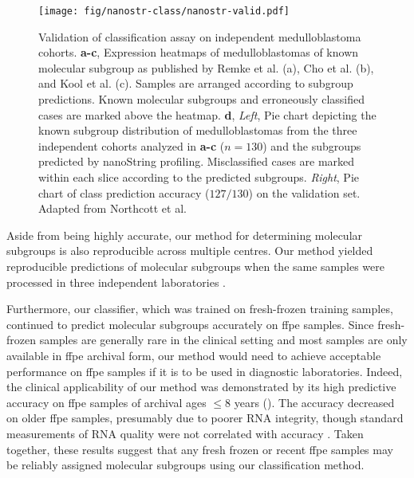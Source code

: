 \begin{figure}[hb]
	\begin{center}
		\texttt{[image: fig/nanostr-class/nanostr-valid.pdf]}
	\end{center}
	\caption[Validation of classification assay on independent medulloblastoma cohorts]
	{
	Validation of classification assay on independent medulloblastoma cohorts.
	\textbf{a-c}, Expression heatmaps of medulloblastomas of known molecular subgroup as published by Remke et al. (a), Cho et al. (b), and Kool et al. (c). Samples are arranged according to subgroup predictions. Known molecular subgroups and erroneously classified cases are marked above the heatmap.
	\textbf{d}, \emph{Left}, Pie chart depicting the known subgroup distribution of medulloblastomas from the three independent cohorts analyzed in \textbf{a-c} ($n = 130$) and the subgroups predicted by nanoString profiling. Misclassified cases are marked within each slice according to the predicted subgroups. \emph{Right}, Pie chart of class prediction accuracy ($127/130$) on the validation set. Adapted from Northcott et al.
	}
	\label{fig:nanostr-valid}
\end{figure}

Aside from being highly accurate, our method for determining molecular subgroups is also reproducible across multiple centres. Our method yielded reproducible predictions of molecular subgroups when the same samples were processed in three independent laboratories .

Furthermore, our classifier, which was trained on fresh-frozen training samples, continued to predict molecular subgroups accurately on \gls{ffpe} samples. Since fresh-frozen samples are generally rare in the clinical setting and most samples are only available in \gls{ffpe} archival form, our method would need to achieve acceptable performance on \gls{ffpe} samples if it is to be used in diagnostic laboratories. Indeed, the clinical applicability of our method was demonstrated by its high predictive accuracy on \gls{ffpe} samples of archival ages $\leq 8$ years (). The accuracy decreased on older \gls{ffpe} samples, presumably due to poorer RNA integrity, though standard measurements of RNA quality were not correlated with accuracy . Taken together, these results suggest that any fresh frozen or recent \gls{ffpe} samples may be reliably assigned molecular subgroups using our classification method.

